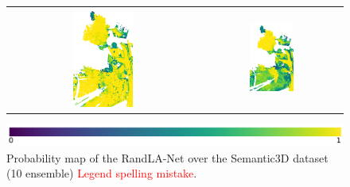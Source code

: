 \begin{figure}[h!]
\begin{tabular}{cc}
            \includegraphics[width=0.33\textwidth, height=0.18\textheight]{images/ood_imgs/de_sem3d/de_prob_10_3.png}&
            \includegraphics[width=0.33\textwidth, height=0.18\textheight]{images/sem3d_of/de_prob_sem3d_of_3.png}\\
        \end{tabular}
        \includegraphics[scale=0.45]{images/prob_legend.pdf}
        \caption{Probability map of the RandLA-Net over the Semantic3D dataset (10 ensemble) \textcolor{red}{Legend spelling mistake}.}
        \label{fig:de_probmap_vis_sem3d_OF}
    \end{figure}
